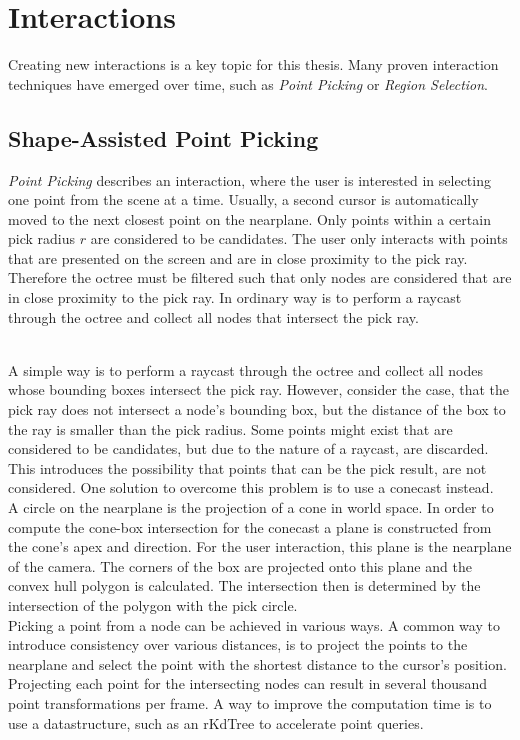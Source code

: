 \chapter{Interactions}

Creating new interactions is a key topic for this thesis. Many proven interaction techniques have emerged over time, such as \textit{Point Picking} or \textit{Region Selection}. 

\section{Shape-Assisted Point Picking}

\textit{Point Picking} describes an interaction, where the user is interested in selecting one point from the scene at a time. Usually, a second cursor is automatically moved to the next closest point on the nearplane. Only points within a certain pick radius $r$ are considered to be candidates. 
The user only interacts with points that are presented on the screen and are in close proximity to the pick ray. Therefore the octree must be filtered such that only nodes are considered that are in close proximity to the pick ray. In ordinary way is to perform a raycast through the octree and collect all nodes that intersect the pick ray. 

\\
A simple way is to perform a raycast through the octree and collect all nodes whose bounding boxes intersect the pick ray. However, consider the case, that the pick ray does not intersect a node's bounding box, but the distance of the box to the ray is smaller than the pick radius. Some points might exist that are considered to be candidates, but due to the nature of a raycast, are discarded. This introduces the possibility that points that can be the pick result, are not considered. One solution to overcome this problem is to use a conecast instead. 
\\
A circle on the nearplane is the projection of a cone in world space. In order to compute the cone-box intersection for the conecast a plane is constructed from the cone's apex and direction. For the user interaction, this plane is the nearplane of the camera. The corners of the box are projected onto this plane and the convex hull polygon is calculated. The intersection then is determined by the intersection of the polygon with the pick circle. 
\\
Picking a point from a node can be achieved in various ways. A common way to introduce consistency over various distances, is to project the points to the nearplane and select the point with the shortest distance to the cursor's position. Projecting each point for the intersecting nodes can result in several thousand point transformations per frame. A way to improve the computation time is to use a datastructure, such as an rKdTree\cite{tobler2011rkd} to accelerate point queries. 
\\
